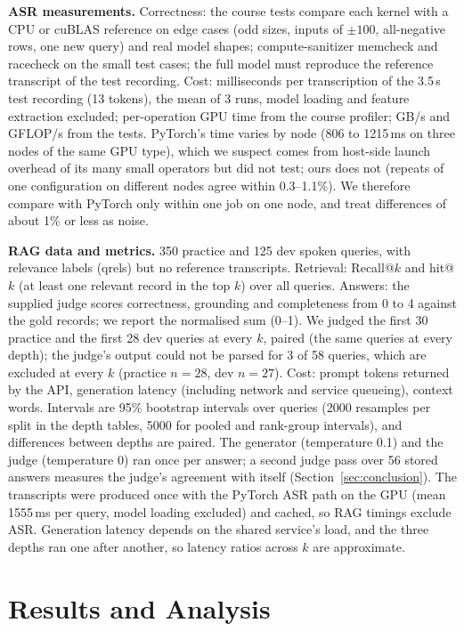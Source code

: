 \documentclass{article}
\begin{document}
\textbf{ASR measurements.} Correctness: the course tests compare each kernel with a CPU or cuBLAS reference on edge cases (odd sizes, inputs of $\pm100$, all-negative rows, one new query) and real model shapes; compute-sanitizer memcheck and racecheck on the small test cases; the full model must reproduce the reference transcript of the test recording. Cost: milliseconds per transcription of the 3.5\,s test recording (13 tokens), the mean of 3 runs, model loading and feature extraction excluded; per-operation GPU time from the course profiler; GB/s and GFLOP/s from the tests. PyTorch's time varies by node (806 to 1215\,ms on three nodes of the same GPU type), which we suspect comes from host-side launch overhead of its many small operators but did not test; ours does not (repeats of one configuration on different nodes agree within 0.3--1.1\%). We therefore compare with PyTorch only within one job on one node, and treat differences of about 1\% or less as noise.

\textbf{RAG data and metrics.} 350 practice and 125 dev spoken queries, with relevance labels (qrels) but no reference transcripts. Retrieval: Recall@$k$ and hit@$k$ (at least one relevant record in the top $k$) over all queries. Answers: the supplied judge scores correctness, grounding and completeness from 0 to 4 against the gold records; we report the normalised sum (0--1). We judged the first 30 practice and the first 28 dev queries at every $k$, paired (the same queries at every depth); the judge's output could not be parsed for 3 of 58 queries, which are excluded at every $k$ (practice $n=28$, dev $n=27$). Cost: prompt tokens returned by the API, generation latency (including network and service queueing), context words. Intervals are 95\% bootstrap intervals over queries (2000 resamples per split in the depth tables, 5000 for pooled and rank-group intervals), and differences between depths are paired. The generator (temperature 0.1) and the judge (temperature 0) ran once per answer; a second judge pass over 56 stored answers measures the judge's agreement with itself (Section~\ref{sec:conclusion}). The transcripts were produced once with the PyTorch ASR path on the GPU (mean 1555\,ms per query, model loading excluded) and cached, so RAG timings exclude ASR. Generation latency depends on the shared service's load, and the three depths ran one after another, so latency ratios across $k$ are approximate.

\section{Results and Analysis}
\label{sec:results}
\end{document}
